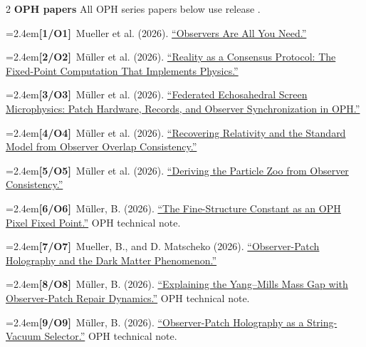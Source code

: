 \documentclass[10pt]{article}
\newcommand{\refentry}[2]{\par\noindent\hangindent=2.4em\hangafter=1\textbf{#1}\ #2}
\begin{document}
{\begin{multicols}{2}
\textbf{OPH papers}
All OPH series papers below use release \texttt{\OPHPaperReleaseID}.
\refentry{[1/O1]}{Mueller et al. (2026). \href{https://github.com/FloatingPragma/observer-patch-holography/blob/main/paper/observers_are_all_you_need.tex}{``Observers Are All You Need.''}}
\refentry{[2/O2]}{M\"uller et al. (2026). \href{https://github.com/FloatingPragma/observer-patch-holography/blob/main/paper/reality_as_consensus_protocol.tex}{``Reality as a Consensus Protocol: The Fixed-Point Computation That Implements Physics.''}}
\refentry{[3/O3]}{M\"uller et al. (2026). \href{https://github.com/FloatingPragma/observer-patch-holography/blob/main/paper/screen_microphysics_and_observer_synchronization.tex}{``Federated Echosahedral Screen Microphysics: Patch Hardware, Records, and Observer Synchronization in OPH.''}}
\refentry{[4/O4]}{M\"uller et al. (2026). \href{https://github.com/FloatingPragma/observer-patch-holography/blob/main/paper/recovering_relativity_and_standard_model_structure_from_observer_overlap_consistency_compact.tex}{``Recovering Relativity and the Standard Model from Observer Overlap Consistency.''}}
\refentry{[5/O5]}{M\"uller et al. (2026). \href{https://github.com/FloatingPragma/observer-patch-holography/blob/main/paper/deriving_the_particle_zoo_from_observer_consistency.tex}{``Deriving the Particle Zoo from Observer Consistency.''}}
\refentry{[6/O6]}{M\"uller, B. (2026). \href{https://github.com/FloatingPragma/observer-patch-holography/blob/main/extra/fine_structure_constant_derivation.tex}{``The Fine-Structure Constant as an OPH Pixel Fixed Point.''} OPH technical note.}
\refentry{[7/O7]}{Mueller, B., and D. Matscheko (2026). \href{https://github.com/FloatingPragma/observer-patch-holography/blob/main/cosmology/oph_dark_matter_paper.tex}{``Observer-Patch Holography and the Dark Matter Phenomenon.''}}
\refentry{[8/O8]}{M\"uller, B. (2026). \href{https://github.com/FloatingPragma/observer-patch-holography/blob/main/extra/yang_mills_gap_clay_problem.tex}{``Explaining the Yang--Mills Mass Gap with Observer-Patch Repair Dynamics.''} OPH technical note.}
\refentry{[9/O9]}{M\"uller, B. (2026). \href{https://github.com/FloatingPragma/observer-patch-holography/blob/main/extra/observer_patch_holography_as_string_vacuum_selector.tex}{``Observer-Patch Holography as a String-Vacuum Selector.''} OPH technical note.}


\end{multicols}}
\end{document}
